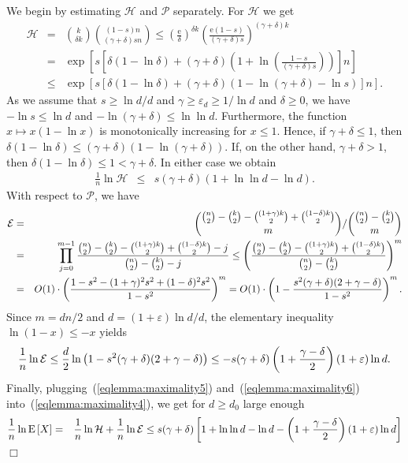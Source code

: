 \documentclass[a4paper,10pt]{article}
\makeatletter
\newenvironment{proof}{\noindent{\bf Proof\@:}}{\hfill $\Box$\\}
\newcommand\cE{\mathcal{E}}
\newcommand\cH{\mathcal{H}}
\newcommand\cP{\mathcal{P}}
\def\cE{{\cal E}}
\newcommand\eul{\mathrm{e}}
\newcommand\eps{\varepsilon}
\newcommand\Erw{\mathrm{E}}
\newcommand{\bink}[2] {{{#1}\choose {#2}}}
\newcommand\bc[1]{\left({#1}\right)}
\newcommand\bcfr[2]{\bc{\frac{#1}{#2}}}
\newcommand\brk[1]{\left\lbrack{#1}\right\rbrack}
\makeatother
\begin{document}
\begin{proof}
We begin by estimating $\cH$ and $\cP$ separately.
For $\cH$ we get
	\begin{eqnarray*}
	\cH&=&\bink k{\delta k}\bink{(1-s)n}{(\gamma+\delta)sn}\leq
			\bcfr{\eul}{\delta}^{\delta k}\bcfr{\eul(1-s)}{(\gamma+\delta)s}^{(\gamma+\delta)k}\\
		&=&\exp\brk{s\brk{\delta(1-\ln\delta)+(\gamma+\delta)\bc{1+\ln\bcfr{1-s}{(\gamma+\delta)s}}}n}\\
		&\leq&\exp\brk{s\brk{\delta(1-\ln\delta)+(\gamma+\delta)\bc{1-\ln(\gamma+\delta)-\ln s}}n}.
	\end{eqnarray*}
As we assume that $s\geq\ln d/d$
 and $\gamma\geq\eps_d\geq1/\ln d$ and $\delta\geq0$, we have
	$-\ln s\leq\ln d$ and $-\ln(\gamma+\delta)\leq\ln\ln d$.
Furthermore, the function $x\mapsto x(1-\ln x)$ is monotonically increasing for $x\leq1$.
Hence, if $\gamma+\delta\leq1$, then $\delta(1-\ln\delta)\leq(\gamma+\delta)\bc{1-\ln(\gamma+\delta)}$.
If, on the other hand, $\gamma+\delta>1$, then
	$\delta(1-\ln\delta)\leq1<\gamma+\delta$.
In either case we obtain
	\begin{eqnarray}\label{eqlemma:maximality5}
	\frac1n\ln\cH&\leq&	s(\gamma+\delta)(1+\ln\ln d-\ln d).
	\end{eqnarray}
With respect to $\cP$, we have \begin{eqnarray*}
	\cE&=&\bink{\bink n2-\bink k2-\bink{(1+\gamma)k}2+\bink{(1-\delta)k}2}{m}/\bink{\bink{n}2-\bink k2}m\\
		&=&\prod_{j=0}^{m-1}\frac{\bink n2-\bink k2-\bink{(1+\gamma)k}2+\bink{(1-\delta)k}2-j}{\bink{n}2-\bink k2-j}
			\leq\bcfr{\bink n2-\bink k2-\bink{(1+\gamma)k}2+\bink{(1-\delta)k}2}{\bink{n}2-\bink k2}^m\\
		&=&O(1)\cdot\bcfr{1-s^2-(1+\gamma)^2s^2+(1-\delta)^2s^2}{1-s^2}^m
		=O(1)\cdot\bc{1-\frac{s^2(\gamma+\delta)(2+\gamma-\delta)}{1-s^2}}^m.
	\end{eqnarray*}
Since $m=dn/2$ and $d=(1+\eps)\ln d/d$, the elementary inequality $\ln(1-x)\leq-x$ yields
	\begin{eqnarray}\label{eqlemma:maximality6}
	\frac1n\ln\cE\leq\frac d2\ln\bc{1-s^2(\gamma+\delta)(2+\gamma-\delta)}
		\leq-s(\gamma+\delta)\bc{1+\frac{\gamma-\delta}{2}}(1+\eps)\ln d.
	\end{eqnarray}
Finally, plugging~(\ref{eqlemma:maximality5}) and~(\ref{eqlemma:maximality6}) into~(\ref{eqlemma:maximality4}), we get
for $d\geq d_0$ large enough
	\begin{eqnarray*}
	\frac1n\ln\Erw\brk X&=&\frac1n\ln\cH+\frac1n\ln\cE\leq
		s(\gamma+\delta)\brk{1+\ln\ln d-\ln d-\bc{1+\frac{\gamma-\delta}{2}}(1+\eps)\ln d}\\

\end{eqnarray*}
\end{proof}
\end{document}
